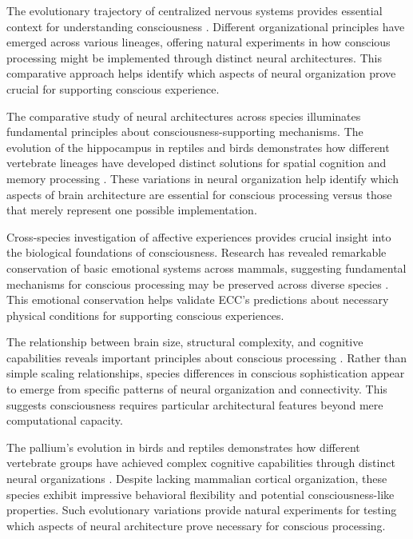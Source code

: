The evolutionary trajectory of centralized nervous systems provides essential context for understanding consciousness \cite{Northcutt2012}. Different organizational principles have emerged across various lineages, offering natural experiments in how conscious processing might be implemented through distinct neural architectures. This comparative approach helps identify which aspects of neural organization prove crucial for supporting conscious experience.

The comparative study of neural architectures across species illuminates fundamental principles about consciousness-supporting mechanisms. The evolution of the hippocampus in reptiles and birds demonstrates how different vertebrate lineages have developed distinct solutions for spatial cognition and memory processing \cite{Striedter2016}. These variations in neural organization help identify which aspects of brain architecture are essential for conscious processing versus those that merely represent one possible implementation.

Cross-species investigation of affective experiences provides crucial insight into the biological foundations of consciousness. Research has revealed remarkable conservation of basic emotional systems across mammals, suggesting fundamental mechanisms for conscious processing may be preserved across diverse species \cite{Panksepp2011}. This emotional conservation helps validate ECC's predictions about necessary physical conditions for supporting conscious experiences.

The relationship between brain size, structural complexity, and cognitive capabilities reveals important principles about conscious processing \cite{Roth2005}. Rather than simple scaling relationships, species differences in conscious sophistication appear to emerge from specific patterns of neural organization and connectivity. This suggests consciousness requires particular architectural features beyond mere computational capacity.

The pallium's evolution in birds and reptiles demonstrates how different vertebrate groups have achieved complex cognitive capabilities through distinct neural organizations \cite{Jarvis2009}. Despite lacking mammalian cortical organization, these species exhibit impressive behavioral flexibility and potential consciousness-like properties. Such evolutionary variations provide natural experiments for testing which aspects of neural architecture prove necessary for conscious processing.

